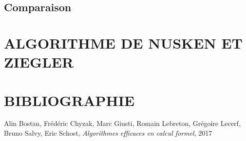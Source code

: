 \documentclass[a4paper]{article}
\begin{document}
\subsection{Comparaison}


\section{ALGORITHME DE NUSKEN ET ZIEGLER}



\newpage
\section{BIBLIOGRAPHIE}

\begin{thebibliography}{10}
     Alin Bostan, Frédéric Chyzak, Marc Giusti, Romain Lebreton, Grégoire Lecerf, Bruno Salvy, Eric Schost,
    \emph{Algorithmes efficaces en calcul formel}, 2017

\end{thebibliography}
\end{document}
